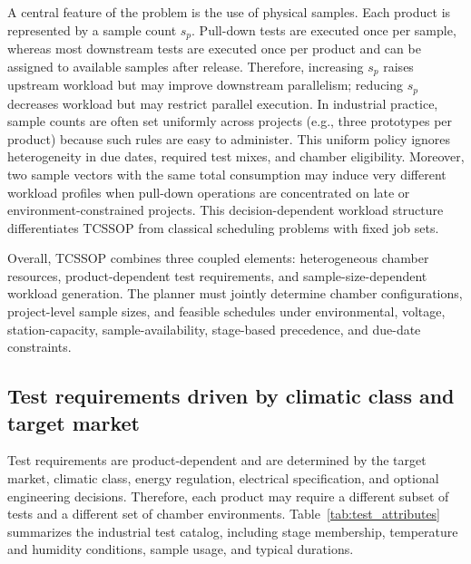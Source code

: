 A central feature of the problem is the use of physical samples. Each product is represented by a sample count \(s_p\). Pull-down tests are executed once per sample, whereas most downstream tests are executed once per product and can be assigned to available samples after release. Therefore, increasing \(s_p\) raises upstream workload but may improve downstream parallelism; reducing \(s_p\) decreases workload but may restrict parallel execution. In industrial practice, sample counts are often set uniformly across projects (e.g., three prototypes per product) because such rules are easy to administer. This uniform policy ignores heterogeneity in due dates, required test mixes, and chamber eligibility. Moreover, two sample vectors with the same total consumption may induce very different workload profiles when pull-down operations are concentrated on late or environment-constrained projects. This decision-dependent workload structure differentiates TCSSOP from classical scheduling problems with fixed job sets.

Overall, TCSSOP combines three coupled elements: heterogeneous chamber resources, product-dependent test requirements, and sample-size-dependent workload generation. The planner must jointly determine chamber configurations, project-level sample sizes, and feasible schedules under environmental, voltage, station-capacity, sample-availability, stage-based precedence, and due-date constraints.

\subsection{Test requirements driven by climatic class and target market}
\label{subsec:test_requirements}

Test requirements are product-dependent and are determined by the target market, climatic class, energy regulation, electrical specification, and optional engineering decisions. Therefore, each product may require a different subset of tests and a different set of chamber environments. Table~\ref{tab:test_attributes} summarizes the industrial test catalog, including stage membership, temperature and humidity conditions, sample usage, and typical durations.

